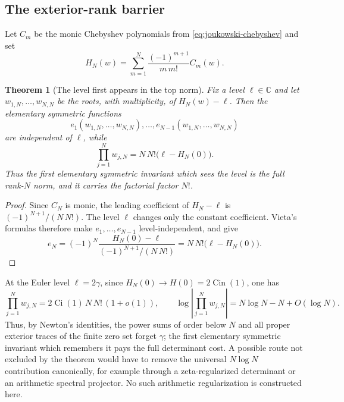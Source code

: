 \documentclass[11pt]{article}
\newtheorem{theorem}{Theorem}[section]
\theoremstyle{definition}
\theoremstyle{remark}
\newcommand{\C}{\mathbb C}
\newcommand{\Cin}{\operatorname{Cin}}
\newcommand{\Ci}{\operatorname{Ci}}
\begin{document}
\subsection{The exterior-rank barrier}

Let $C_m$ be the monic Chebyshev polynomials from
\eqref{eq:joukowski-chebyshev} and set
\begin{equation}\label{eq:HN-truncation}
 H_N(w)=\sum_{m=1}^N\frac{(-1)^{m+1}}{m\,m!}C_m(w).
\end{equation}

\begin{theorem}[The level first appears in the top norm]
\label{thm:top-norm-barrier}
Fix a level $\ell\in\C$ and let
$w_{1,N},\ldots,w_{N,N}$ be the roots, with multiplicity, of
$H_N(w)-\ell$.  Then the elementary symmetric functions
\[
 e_1(w_{1,N},\ldots,w_{N,N}),\ldots,
 e_{N-1}(w_{1,N},\ldots,w_{N,N})
\]
are independent of $\ell$, while
\begin{equation}\label{eq:top-norm-exact}
 \boxed{
 \prod_{j=1}^N w_{j,N}
 =N\,N!\bigl(\ell-H_N(0)\bigr).}
\end{equation}
Thus the first elementary symmetric invariant which sees the level is the full
rank-$N$ norm, and it carries the factorial factor $N!$.
\end{theorem}

\begin{proof}
Since $C_N$ is monic, the leading coefficient of $H_N-\ell$ is
$(-1)^{N+1}/(N\,N!)$.  The level $\ell$ changes only the constant
coefficient.  Vieta's formulas therefore make $e_1,\ldots,e_{N-1}$
level-independent, and give
\[
 e_N=(-1)^N
 \frac{H_N(0)-\ell}{(-1)^{N+1}/(N\,N!)}
 =N\,N!\bigl(\ell-H_N(0)\bigr).
\]
\end{proof}

At the Euler level $\ell=2\gamma$, since
$H_N(0)\to H(0)=2\Cin(1)$, one has
\[
 \prod_{j=1}^Nw_{j,N}=2\Ci(1)\,N\,N!\,(1+o(1)),
 \qquad
 \log\left|\prod_{j=1}^Nw_{j,N}\right|
 =N\log N-N+O(\log N).
\]
Thus, by Newton's identities, the power sums of order below $N$ and all
proper exterior traces of the finite zero set forget $\gamma$; the first
elementary symmetric invariant which
remembers it pays the full determinant cost.  A possible route not excluded
by the theorem
would have to remove the universal $N\log N$ contribution canonically, for
example through a zeta-regularized determinant or an arithmetic spectral
projector.  No such arithmetic regularization is constructed here.
\end{document}
